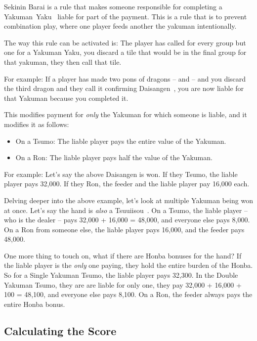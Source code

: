 Sekinin Barai is a rule that makes someone responsible for completing a Yakuman~Yaku~ liable for part of the payment. This is a rule that is to prevent combination play, where one player feeds another the yakuman intentionally.

The way this rule can be activated is: The player has called for every group but one for a Yakuman Yaku, you discard a tile that would be in the final group for that yakuman, they then call that tile.

For example: If a player has made two pons of dragons -- {} and {} -- and you discard the third dragon and they call it confirming Daisangen~, you are now liable for that Yakuman because you completed it.

This modifies payment for \textit{only} the Yakuman for which someone is liable, and it modifies it as follows:
\begin{itemize}
	\item On a Tsumo: The liable player pays the entire value of the Yakuman. \\
	\item On a Ron: The liable player pays half the value of the Yakuman.
\end{itemize}

For example: Let's say the above Daisangen is won. If they Tsumo, the liable player pays 32,000. If they Ron, the feeder and the liable player pay 16,000 each.

Delving deeper into the above example, let's look at multiple Yakuman being won at once. Let's say the hand is \textit{also} a Tsuuiisou~. On a Tsumo, the liable player -- who is the dealer -- pays 32,000 + 16,000 = 48,000, and everyone else pays 8,000. On a Ron from someone else, the liable player pays 16,000, and the feeder pays 48,000.

One more thing to touch on, what if there are Honba bonuses for the hand? If the liable player is the \textit{only} one paying, they hold the entire burden of the Honba. So for a Single Yakuman Tsumo, the liable player pays 32,300. In the Double Yakuman Tsumo, they are are liable for only one, they pay 32,000 + 16,000 + 100 = 48,100, and everyone else pays 8,100. On a Ron, the feeder always pays the entire Honba bonus.

\subsection{Calculating the Score}\label{core:ssec:calcs}

